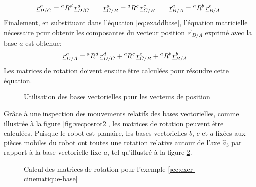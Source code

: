 \begin{align}
	\underline{r}_{D/C}^a = {}^aR^d \, \underline{r}_{D/C}^d
	\quad \quad
	\underline{r}_{C/B}^a = {}^aR^c \, \underline{r}_{C/B}^c
	\quad \quad
	\underline{r}_{B/A}^a = {}^aR^b \, \underline{r}_{B/A}^b
\end{align}
Finalement, en substituant dans l'équation \eqref{eq:exaddbase}, l'équation matricielle nécessaire pour obtenir les composantes du vecteur position $\vec{r}_{D/A}$ exprimé avec la base $a$ est obtenue:
\begin{align}
	\underline{r}_{D/A}^a &= {}^aR^d \, \underline{r}_{D/C}^d + {}^aR^c \, \underline{r}_{C/B}^c + {}^aR^b \, \underline{r}_{B/A}^b
	\label{eq:ex333cinematique}
\end{align}
Les matrices de rotation doivent ensuite être calculées pour résoudre cette équation.
\begin{figure}[H]
	\centering
	\hspace{10pt}
	\hspace{10pt}
	\caption{Utilisation des bases vectorielles pour les vecteurs de position}
	\label{fig:vecposrot}
\end{figure}
Grâce à une inspection des mouvements relatifs des bases vectorielles, comme illustrée à la figure \ref{fig:vecposrot2}, les matrices de rotation peuvent être calculées. Puisque le robot est planaire, les bases vectorielles $b$, $c$ et $d$ fixées aux pièces mobiles du robot ont toutes une rotation relative autour de l'axe $\hat{a}_3$ par rapport à la base vectorielle fixe $a$, tel qu'illustré à la figure \ref{fig:exer-cinematique-base-rotation}.
%
\begin{figure}[H]
	\centering
	\hspace{10pt}
	\hspace{10pt}
	\caption{Calcul des matrices de rotation pour l'exemple \ref{sec:exer-cinematique-base}}
	\label{fig:exer-cinematique-base-rotation}
\end{figure}
